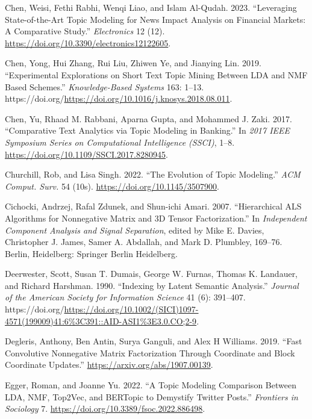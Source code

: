 \documentclass[
]{article}
\newlength{\cslhangindent}
\newlength{\cslentryspacingunit} %
\newenvironment{CSLReferences}[2] %
 {%
  \setlength{\parindent}{0pt}
  \ifodd #1
  \let\oldpar\par
  \def\par{\hangindent=\cslhangindent\oldpar}
  \fi
  \setlength{\parskip}{#2\cslentryspacingunit}
 }%
 {}
\begin{document}
\begin{CSLReferences}{1}{0}
\leavevmode{}%
Chen, Weisi, Fethi Rabhi, Wenqi Liao, and Islam Al-Qudah. 2023. {``Leveraging State-of-the-Art Topic Modeling for News Impact Analysis on Financial Markets: A Comparative Study.''} \emph{Electronics} 12 (12). \url{https://doi.org/10.3390/electronics12122605}.

\leavevmode{}%
Chen, Yong, Hui Zhang, Rui Liu, Zhiwen Ye, and Jianying Lin. 2019. {``Experimental Explorations on Short Text Topic Mining Between LDA and NMF Based Schemes.''} \emph{Knowledge-Based Systems} 163: 1--13. https://doi.org/\url{https://doi.org/10.1016/j.knosys.2018.08.011}.

\leavevmode{}%
Chen, Yu, Rhaad M. Rabbani, Aparna Gupta, and Mohammed J. Zaki. 2017. {``Comparative Text Analytics via Topic Modeling in Banking.''} In \emph{2017 IEEE Symposium Series on Computational Intelligence (SSCI)}, 1--8. \url{https://doi.org/10.1109/SSCI.2017.8280945}.

\leavevmode{}%
Churchill, Rob, and Lisa Singh. 2022. {``The Evolution of Topic Modeling.''} \emph{ACM Comput. Surv.} 54 (10s). \url{https://doi.org/10.1145/3507900}.

\leavevmode{}%
Cichocki, Andrzej, Rafal Zdunek, and Shun-ichi Amari. 2007. {``Hierarchical ALS Algorithms for Nonnegative Matrix and 3D Tensor Factorization.''} In \emph{Independent Component Analysis and Signal Separation}, edited by Mike E. Davies, Christopher J. James, Samer A. Abdallah, and Mark D. Plumbley, 169--76. Berlin, Heidelberg: Springer Berlin Heidelberg.

\leavevmode{}%
Deerwester, Scott, Susan T. Dumais, George W. Furnas, Thomas K. Landauer, and Richard Harshman. 1990. {``Indexing by Latent Semantic Analysis.''} \emph{Journal of the American Society for Information Science} 41 (6): 391--407. https://doi.org/\url{https://doi.org/10.1002/(SICI)1097-4571(199009)41:6\%3C391::AID-ASI1\%3E3.0.CO;2-9}.

\leavevmode{}%
Degleris, Anthony, Ben Antin, Surya Ganguli, and Alex H Williams. 2019. {``Fast Convolutive Nonnegative Matrix Factorization Through Coordinate and Block Coordinate Updates.''} \url{https://arxiv.org/abs/1907.00139}.

\leavevmode{}%
Egger, Roman, and Joanne Yu. 2022. {``A Topic Modeling Comparison Between LDA, NMF, Top2Vec, and BERTopic to Demystify Twitter Posts.''} \emph{Frontiers in Sociology} 7. \url{https://doi.org/10.3389/fsoc.2022.886498}.


\end{CSLReferences}
\end{document}

